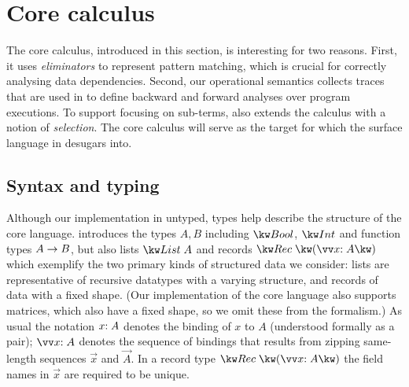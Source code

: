 \section{Core calculus}
\label{sec:core-language}

The core calculus, introduced in this section, is interesting for two reasons. First, it uses \emph{eliminators} to represent pattern matching, which is crucial for correctly analysing data dependencies. Second, our operational semantics collects traces that are used in  to define backward and forward analyses over program executions. To support focusing on sub-terms,  also extends the calculus with a notion of \emph{selection}. The core calculus will serve as the target for which the surface language in  desugars into.


\subsection{Syntax and typing}
\label{sec:core-language:syntax-typing}

Although our implementation in untyped, types help describe the structure of the core language.  introduces the types $A, B$ including $\tyBool$, $\tyInt$ and function types ${A}\rightarrow{B}$, but also lists $\tyList{A}$ and records $\tyRec{\vec{\bind{x}{A}}}$ which exemplify the two primary kinds of structured data we consider: lists are representative of recursive datatypes with a varying structure, and records of data with a fixed shape. (Our implementation of the core language also supports matrices, which also have a fixed shape, so we omit these from the formalism.) As usual the notation $x{:}\;A$ denotes the binding of $x$ to $A$ (understood formally as a pair); $\seq{\bind{x}{A}}$ denotes the sequence of bindings that results from zipping same-length sequences $\vec{x}$ and $\vec{A}$. In a record type $\tyRec{\vec{\bind{x}{A}}}$ the field names in $\vec{x}$ are required to be unique.



